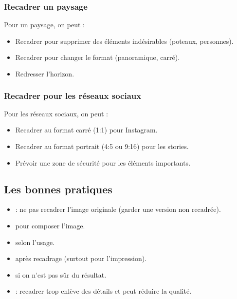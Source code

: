 \subsubsection{Recadrer un paysage}

Pour un paysage, on peut :

\begin{itemize}
    \item Recadrer pour supprimer des éléments indésirables (poteaux, personnes).
    \item Recadrer pour changer le format (panoramique, carré).
    \item Redresser l'horizon.
\end{itemize}

\subsubsection{Recadrer pour les réseaux sociaux}

Pour les réseaux sociaux, on peut :

\begin{itemize}
    \item Recadrer au format carré (1:1) pour Instagram.
    \item Recadrer au format portrait (4:5 ou 9:16) pour les stories.
    \item Prévoir une zone de sécurité pour les éléments importants.
\end{itemize}

\subsection{Les bonnes pratiques}

\begin{itemize}
    \item {} : ne pas recadrer l'image originale (garder une version non recadrée).
    \item {} pour composer l'image.
    \item {} selon l'usage.
    \item {} après recadrage (surtout pour l'impression).
    \item {} si on n'est pas sûr du résultat.
    \item {} : recadrer trop enlève des détails et peut réduire la qualité.
\end{itemize}

